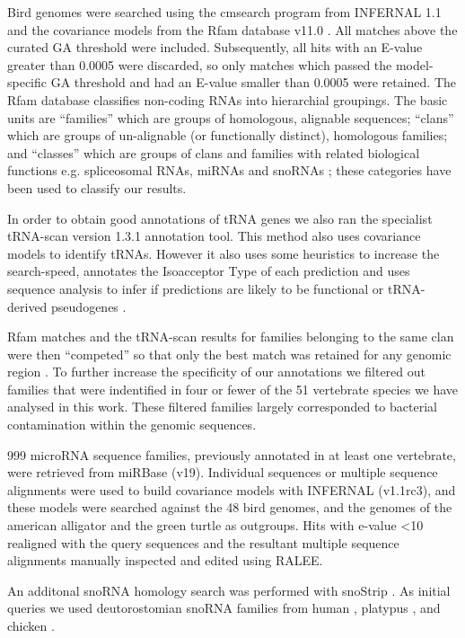 \documentclass[10pt]{bmc_article}
\newenvironment{bmcformat}{\begin{raggedright}\baselineskip20pt\sloppy\setboolean{publ}{false}}{\end{raggedright}\baselineskip20pt\sloppy}
\begin{document}
\begin{bmcformat}
Bird genomes were searched using the cmsearch program from INFERNAL
1.1 and the covariance models from the Rfam database
v11.0 \cite{Gardner:2011a,Burge:2013}. All matches above the curated GA
threshold were included. Subsequently, all hits with an E-value
greater than 0.0005 were discarded, so only matches which passed the
model-specific GA threshold and had an E-value smaller than 0.0005
were retained. The Rfam database classifies non-coding RNAs into
hierarchial groupings. The basic units are ``families'' which are
groups of homologous, alignable sequences; ``clans'' which are groups
of un-alignable (or functionally distinct), homologous families; and
``classes'' which are groups of clans and families with related
biological functions e.g. spliceosomal RNAs, miRNAs and snoRNAs
\cite{Griffiths-Jones:2003,Griffiths-Jones:2005,Gardner:2009,Gardner:2011a,Burge:2013};
these categories have been used to classify our results.

In order to obtain good annotations of tRNA genes we also ran the
specialist tRNA-scan version 1.3.1 annotation tool. This method also
uses covariance models to identify tRNAs. However it also uses some
heuristics to increase the search-speed, annotates the Isoacceptor
Type of each prediction and uses sequence analysis to infer if
predictions are likely to be functional or tRNA-derived pseudogenes
\cite{Lowe:1997,Chan:2009}.

Rfam matches and the tRNA-scan results for families belonging to the
same clan were then ``competed'' so that only the best match was
retained for any genomic region \cite{Gardner:2011a}.  To further
increase the specificity of our annotations we filtered out families
that were indentified in four or fewer of the 51 vertebrate species we
have analysed in this work. These filtered families largely
corresponded to bacterial contamination within the genomic sequences.

999 microRNA sequence families, previously annotated in at least one
vertebrate, were retrieved from miRBase (v19). Individual sequences or
multiple sequence alignments were used to build covariance models with
INFERNAL (v1.1rc3), and these models were searched against the 48 bird
genomes, and the genomes of the american alligator and the green
turtle as outgroups. Hits with e-value <10 realigned with the query
sequences and the resultant multiple sequence alignments manually
inspected and edited using RALEE.

An additonal snoRNA homology search was performed with snoStrip
\cite{Bartschat:2013}. As initial queries we used deutorostomian
snoRNA families from human \cite{Lestrade:2006}, platypus
\cite{Schmitz:2008}, and chicken \cite{Shao:2009}.


\end{bmcformat}
\end{document}
